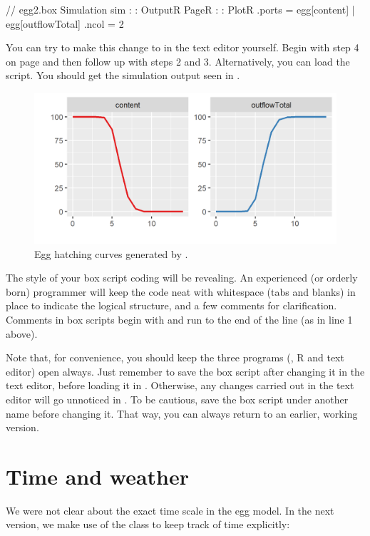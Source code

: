 \lstset{numbers=left}
\begin{boxscript}
// egg2.box
Simulation sim {
:
:
  OutputR {
    PageR {
:
:
      PlotR {
        .ports = egg[content] | egg[outflowTotal]
        .ncol = 2
      }
    }
  }
}
\end{boxscript}
\lstset{numbers=none}

You can try to make this change to  in the text editor yourself. Begin with step 4 on page \pageref{NielsH} and then follow up with steps 2 and 3. Alternatively, you can load the  script. You should get the simulation output seen in .
 
\begin{figure}
\centering
\includegraphics{graphics/egg2}
\caption{Egg hatching curves generated by .}
\label{fig:egg2}
\end{figure}

The style of your box script coding will be revealing. An experienced (or orderly born) programmer will keep the code neat with whitespace (tabs and blanks) in place to indicate the logical structure, and a few comments for clarification. Comments in box scripts begin with \code{//} and run to the end of the line (as in line 1 above).

Note that, for convenience, you should keep the three programs (\US, R and text editor) open always. Just remember to save the box script after changing it in the text editor, before loading it in \US. Otherwise, any changes carried out in the text editor will go unnoticed in \US. To be cautious, save the box script under another name before changing it. That way, you can always return to an earlier, working version.

\section{Time and weather}
We were not clear about the exact time scale in the egg model. In the next version, we make use of the  class to keep track of time explicitly:

